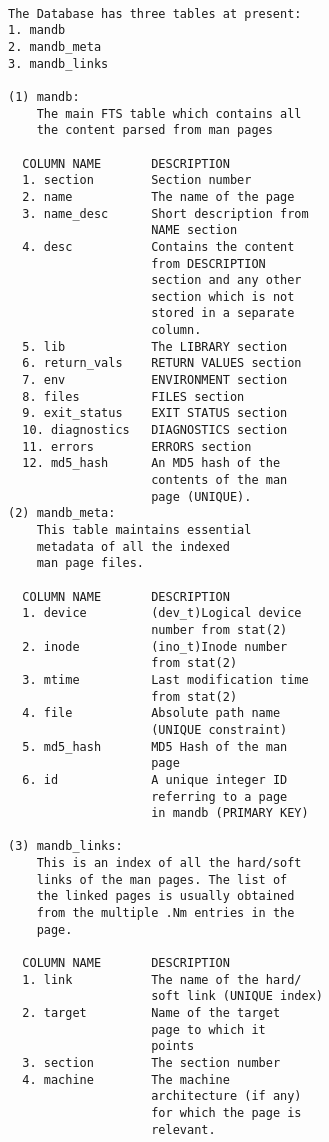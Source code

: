 \documentclass[letterpaper,twocolumn,10pt]{article}
\begin{document}
{\tt \small
{}
\begin{lstlisting}
The Database has three tables at present:
1. mandb
2. mandb_meta
3. mandb_links

(1) mandb:
    The main FTS table which contains all
    the content parsed from man pages

  COLUMN NAME       DESCRIPTION
  1. section        Section number
  2. name           The name of the page  
  3. name_desc      Short description from
                    NAME section  
  4. desc           Contains the content
                    from DESCRIPTION
                    section and any other
                    section which is not
                    stored in a separate
                    column.
  5. lib            The LIBRARY section
  6. return_vals    RETURN VALUES section
  7. env            ENVIRONMENT section
  8. files          FILES section
  9. exit_status    EXIT STATUS section
  10. diagnostics   DIAGNOSTICS section
  11. errors        ERRORS section
  12. md5_hash      An MD5 hash of the
                    contents of the man
                    page (UNIQUE).
(2) mandb_meta:
    This table maintains essential
    metadata of all the indexed
    man page files.

  COLUMN NAME       DESCRIPTION
  1. device         (dev_t)Logical device
                    number from stat(2)
  2. inode          (ino_t)Inode number
                    from stat(2)
  3. mtime          Last modification time
                    from stat(2)
  4. file           Absolute path name
                    (UNIQUE constraint)
  5. md5_hash       MD5 Hash of the man
                    page
  6. id             A unique integer ID
                    referring to a page
                    in mandb (PRIMARY KEY)

(3) mandb_links:
    This is an index of all the hard/soft
    links of the man pages. The list of
    the linked pages is usually obtained 
    from the multiple .Nm entries in the
    page.

  COLUMN NAME       DESCRIPTION
  1. link           The name of the hard/
                    soft link (UNIQUE index) 
  2. target         Name of the target
                    page to which it
                    points  
  3. section        The section number  
  4. machine        The machine
                    architecture (if any)
                    for which the page is
                    relevant.
\end{lstlisting}
}
\end{document}
